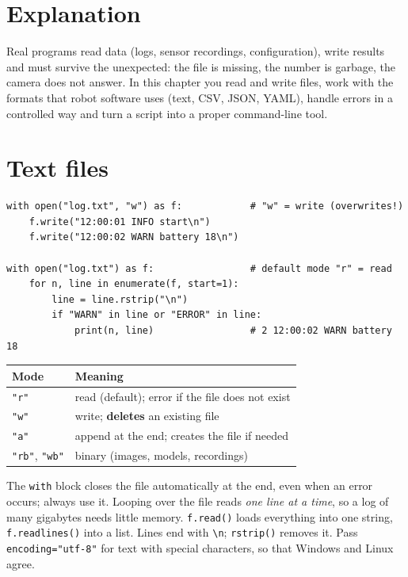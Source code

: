 \label{ch:py5}

\section*{Explanation}
Real programs read data (logs, sensor recordings, configuration), write results and must survive the unexpected: the file is missing, the number is garbage, the camera does not answer. In this chapter you read and write files, work with the formats that robot software uses (text, CSV, JSON, YAML), handle errors in a controlled way and turn a script into a proper command-line tool.

\section*{Text files}
\begin{verbatim}
with open("log.txt", "w") as f:            # "w" = write (overwrites!)
    f.write("12:00:01 INFO start\n")
    f.write("12:00:02 WARN battery 18\n")

with open("log.txt") as f:                 # default mode "r" = read
    for n, line in enumerate(f, start=1):
        line = line.rstrip("\n")
        if "WARN" in line or "ERROR" in line:
            print(n, line)                 # 2 12:00:02 WARN battery 18
\end{verbatim}
\begin{center}
\renewcommand{\arraystretch}{1.2}
\begin{tabular}{p{1.4cm}p{11.6cm}}
\textbf{Mode} & \textbf{Meaning}\\ \hline
\texttt{"r"} & read (default); error if the file does not exist\\
\texttt{"w"} & write; \textbf{deletes} an existing file\\
\texttt{"a"} & append at the end; creates the file if needed\\
\texttt{"rb"}, \texttt{"wb"} & binary (images, models, recordings)\\
\end{tabular}
\end{center}
The \texttt{with} block closes the file automatically at the end, even when an error occurs; always use it. Looping over the file reads \emph{one line at a time}, so a log of many gigabytes needs little memory. \texttt{f.read()} loads everything into one string, \texttt{f.readlines()} into a list. Lines end with \verb!\n!; \texttt{rstrip()} removes it. Pass \texttt{encoding="utf-8"} for text with special characters, so that Windows and Linux agree.

